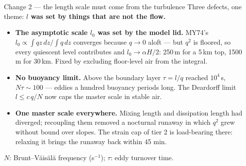 \documentclass[10pt,aspectratio=169]{beamer}
\begin{document}
\begin{frame}{Change 2 --- the length scale must come from the turbulence}
  Three defects, one theme: \textbf{$l$ was set by things that are not the flow.}
  \vspace{1ex}
  \begin{itemize}
    \item \textbf{The asymptotic scale $l_0$ was set by the model lid.} MY74's
      $l_0 \propto \int q z\,dz / \int q\,dz$ converges because $q\to0$ aloft ---
      but $q^2$ is floored, so every quiescent level contributes and
      $l_0 \to \alpha H/2$: 250\,m for a 5\,km top, 1500\,m for 30\,km.
      Fixed by excluding floor-level air from the integral.
    \item \textbf{No buoyancy limit.} Above the boundary layer
      $\tau = l/q$ reached $10^4$\,s, $N\tau \sim 100$ --- eddies a hundred
      buoyancy periods long. The Deardorff limit $l \le c\,q/N$ now caps the
      master scale in stable air.
    \item \textbf{One master scale everywhere.} Mixing length and dissipation
      length had diverged; recoupling them removed a nocturnal runaway in which
      $q^2$ grew without bound over slopes. The strain cap of tier 2 is
      load-bearing there: relaxing it brings the runaway back within 45 min.
  \end{itemize}
  \vspace{1ex}
  $N$: Brunt--V\"ais\"al\"a frequency (s$^{-1}$); $\tau$: eddy turnover time.
\end{frame}
\end{document}
